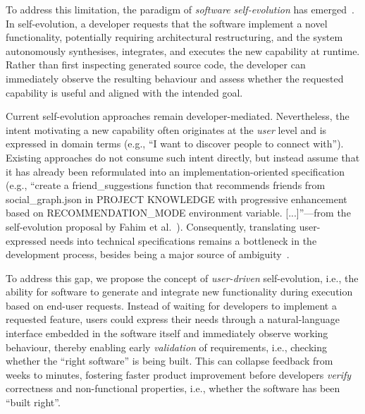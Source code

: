 \documentclass[sigconf,screen]{acmart}
\begin{document}
To address this limitation, the paradigm of \textit{software self-evolution} has emerged~\cite{fahim2026selfevolve}. In self-evolution, a developer requests that the software implement a novel functionality, potentially requiring architectural restructuring, and the system autonomously synthesises, integrates, and executes the new capability at runtime. Rather than first inspecting generated source code, the developer can immediately observe the resulting behaviour and assess whether the requested capability is useful and aligned with the intended goal.

Current self-evolution approaches remain developer-mediated. Nevertheless, the intent motivating a new capability often originates at the \textit{user} level and is expressed in domain terms
(e.g., ``I want to discover people to connect with'').
Existing approaches do not consume such intent directly, but instead assume that it has already been reformulated into an implementation-oriented specification
(e.g., ``create a friend\_suggestions function that recommends friends from social\_graph.json in PROJECT KNOWLEDGE with progressive enhancement based on RECOMMENDATION\_MODE environment variable. [...]''---from the self-evolution proposal by Fahim et al.~\cite{fahim2026selfevolve}).
Consequently, translating user-expressed needs into technical specifications remains a bottleneck in the development process, besides being a major source of ambiguity~\cite{ferrari2015ambiguity}.

To address this gap, we propose the concept of \textit{user-driven} self-evolution, i.e., the ability for software to generate and integrate new functionality during execution based on end-user requests. Instead of waiting for developers to implement a requested feature, users could express their needs through a natural-language interface embedded in the software itself and immediately observe working behaviour, thereby enabling early \textit{validation} of requirements, i.e., checking whether the ``right software'' is being built. This can collapse feedback from weeks to minutes, fostering faster product improvement before developers \textit{verify} correctness and non-functional properties, i.e., whether the software has been ``built right''.
\end{document}
